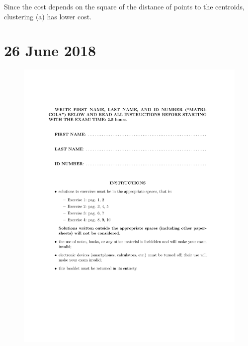\documentclass[a4paper,11pt,oneside]{book}
\begin{document}
\begin{enumerate}
        \begin{solution}
            Since the cost depends on the square of the distance of points to the centroids, clustering (a) has lower cost.

        \end{solution}
\end{enumerate}


\chapter{26 June 2018}

\begin{figure}[H]
    \centering
    \begin{minipage}{0.45\textwidth}
        \includegraphics[width=\textwidth,page=3]{images/26_Jun_2018.pdf}
    \end{minipage}
    \hfill
    \begin{minipage}{0.45\textwidth}

\end{minipage}
\end{figure}
\end{document}
